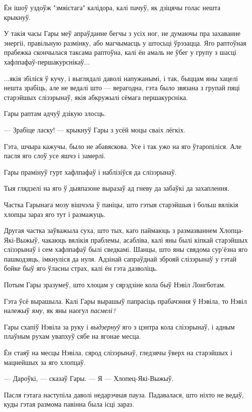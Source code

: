 Ён ішоў уздоўж "змяістага" калідора, калі пачуў, як дзіцячы голас нешта крыкнуў.

У такія часы Гары меў апраўданне бегчы з усіх ног, не думаючы пра захаванне энергіі,
правільную размінку, або магчымасць у штосьці ўрэзацца. Яго раптоўная прабежка
скончылася таксама раптоўна, калі ён амаль не ўбег у групу з шасці 
хафлпафаў-першакурснікаў...

...якія збіліся ў кучу, і выглядалі даволі напужанымі, і так, быццам яны хацелі 
нешта зрабіць, але не ведалі што --- верагодна, гэта было звязана з групай 
пяці старэйшых слізэрынаў, якія абкружылі сёмага першакурсніка. 

Гары раптам адчуў дзікую злосць.

--- Зрабіце ласку! --- крыкнуў Гары з усёй моцы сваіх лёгкіх.

Гэта, шчыра кажучы, было не абавяскова. Усе і так ужо на яго ўтаропіліся.
Але пасля яго слоў усе яшчэ і замерлі.

Гары прамінуў  гурт хафлпафаў і наблізіўся  да слізэрынаў.

Тыя глядзелі на яго ў дыяпазоне выразаў ад гневу да забаўкі да захаплення.

Частка Гарынага мозу вішчэла ў паніцы, што гэтыя старэйшыя і больш вялікія хлопцы
зараз яго тут і размажуць.

Другая частка заўважыла суха, што тых, каго паймаюць з размазваннем Хлопца-Які-Выжыў,
чакаюць вялікія праблемы, асабліва, калі яны былі кіпкай старэйшых слізэрынаў і
сем хафлпафаў былі сведкамі. Шанцы, што яны свядома сур'ёзна яго пашкодзяць, імкнуліся
да нуля. Адзінай сапраўднай зброяй слізэрынаў у гэтай бойке быў яго ўласны страх,
калі ён гэта дазволіць.

Потым Гары зразумеў, што хлоцам у сярэдзіне кола быў Нэвіл Лонгботам.

Гэта ўсё вырашыла. Калі Гары вырашыў папрасіць прабачэння ў Нэвіла, то Нэвіл 
належыў \emph{яму}, як яны наогул \emph{пасмелі?}

Гары схапіў Нэвіла за руку і \emph{выдзернуў} яго з цэнтра кола слізэрынаў, 
і адным плаўным рухам увапхуў сябе на ягонае месца.

Ён стаяў на месцы Нэвіла, сярод слізэрынаў, гледзячы ўверх на старэйшых і мацнейшых 
за яго хлопцаў.

--- Дароўкі, --- сказаў Гары. --- Я --- Хлопец-Які-Выжыў.

Пасля гэтага наступіла даволі недарэчная пауза. Падавалася, што ніхто не ведаў,
куды гэтая размома павінна была ісці зараз.


